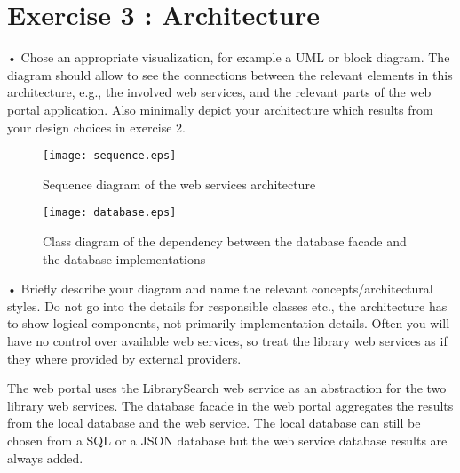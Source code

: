 \section{Exercise 3 : Architecture}

    • Chose an appropriate visualization, for example a UML or block diagram. The
    diagram should allow to see the connections between the relevant elements in this
    architecture, e.g., the involved web services, and the relevant parts of the web
    portal application. Also minimally depict your architecture which results from
    your design choices in exercise 2.

    \begin{figure}[p]
      \texttt{[image: sequence.eps]}
      \caption{\label{fig:before}Sequence diagram of the web services architecture}
    \end{figure}

    \begin{figure}[p]
      \texttt{[image: database.eps]}
      \caption{\label{fig:before}Class diagram of the dependency between the database facade and the database implementations}
    \end{figure}

    • Briefly describe your diagram and name the relevant concepts/architectural styles.
    Do not go into the details for responsible classes etc., the architecture has to show
    logical components, not primarily implementation details. Often you will have no
    control over available web services, so treat the library web services as if they where
    provided by external providers.

    The web portal uses the LibrarySearch web service as an abstraction for the two library web services.
    The database facade in the web portal aggregates the results from the local database and the web service. The local database can still be chosen from a SQL or a JSON database but the web service database results are always added.
